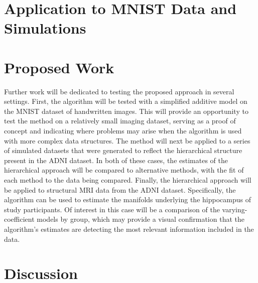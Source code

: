 \documentclass[11pt,reqno]{article}
\theoremstyle{definition}
\begin{document}
\section{Application to MNIST Data and Simulations}\label{s:hpme_mnist_simulation}

\section{Proposed Work} \label{s:hpme_adni}
Further work will be dedicated to testing the proposed approach in several settings. First, the algorithm will be tested with a simplified additive model on the MNIST dataset of handwritten images. This will provide an opportunity to test the method on a relatively small imaging dataset, serving as a proof of concept and indicating where problems may arise when the algorithm is used with more complex data structures. The method will next be applied to a series of simulated datasets that were generated to reflect the hierarchical structure present in the ADNI dataset. In both of these cases, the estimates of the hierarchical approach will be compared to alternative methods, with the fit of each method to the data being compared. Finally, the hierarchical approach will be applied to structural MRI data from the ADNI dataset. Specifically, the algorithm can be used to estimate the manifolds underlying the hippocampus of study participants. Of interest in this case will be a comparison of the varying-coefficient models by group, which may provide a visual confirmation that the algorithm's estimates are detecting the most relevant information included in the data.

\section{Discussion} \label{s:hpme_discussion}

\newpage

\nocite{*}
%
%
\printbibliography
\end{document}
